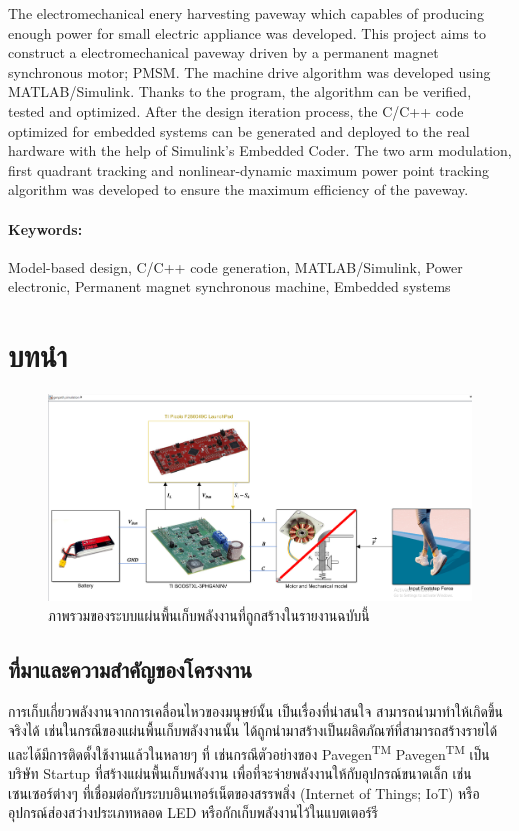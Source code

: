 \documentclass[11pt,a4paper]{article}
\begin{document}
The electromechanical enery harvesting paveway which capables of producing enough power for small electric appliance was developed. This project aims to construct a electromechanical paveway driven by a permanent magnet synchronous motor; PMSM. The machine drive algorithm was developed using MATLAB/Simulink. Thanks to the program, the algorithm can be verified, tested and optimized. After the design iteration process, the C/C++ code optimized for embedded systems can be generated and deployed to the real hardware with the help of Simulink's Embedded Coder. The two arm modulation, first quadrant tracking and nonlinear-dynamic maximum power point tracking algorithm was developed to ensure the maximum efficiency of the paveway.

\paragraph{\textbf Keywords:} Model-based design, C/C++ code generation, MATLAB/Simulink, Power electronic, Permanent magnet synchronous machine, Embedded systems

\newpage
\thispagestyle{empty}
\tableofcontents

\newpage
\setcounter{page}{1}
\section{บทนำ}

\begin{figure}
    \centering
    \includegraphics[width=\textwidth]{layer0.png}
    \caption{ภาพรวมของระบบแผ่นพื้นเก็บพลังงานที่ถูกสร้างในรายงานฉบับนี้}
\end{figure}

\subsection{ที่มาและความสำคัญของโครงงาน}
การเก็บเกี่ยวพลังงานจากการเคลื่อนไหวของมนุษย์นั้น เป็นเรื่องที่น่าสนใจ สามารถนำมาทำให้เกิดขึ้นจริงได้ เช่นในกรณีของแผ่นพื้นเก็บพลังงานนั้น ได้ถูกนำมาสร้างเป็นผลิตภัณฑ์ที่สามารถสร้างรายได้ และได้มีการติดตั้งใช้งานแล้วในหลายๆ ที่ เช่นกรณีตัวอย่างของ Pavegen\textsuperscript{TM} Pavegen\textsuperscript{TM} เป็นบริษัท Startup ที่สร้างแผ่นพื้นเก็บพลังงาน เพื่อที่จะจ่ายพลังงานให้กับอุปกรณ์ขนาดเล็ก เช่น เซนเซอร์ต่างๆ ที่เชื่อมต่อกับระบบอินเทอร์เน็ตของสรรพสิ่ง (Internet of Things; IoT) หรืออุปกรณ์ส่องสว่างประเภทหลอด LED หรือกักเก็บพลังงานไว้ในแบตเตอร์รี
\end{document}
